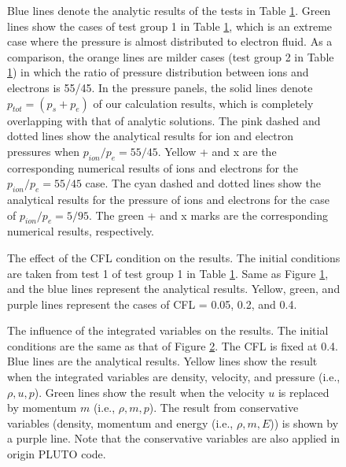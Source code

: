 \documentclass[journal, onecolumn]{aastex631}
\begin{document}
\begin{CJK*}{UTF8}{gbsn}
\begin{appendix}
\begin{table}[!t]
\begin{threeparttable}[t]
\begin{tabular}{ccccccccccc}
\bottomrule

\end{tabular}\label{tab:test_para}
\end{threeparttable}
\end{table}


\begin{figure}[ht!]
\caption{Blue lines denote the analytic results of the tests in Table \ref{tab:test_para}. Green lines show the cases of test group 1 in Table \ref{tab:test_para}, which is an extreme case where the pressure is almost distributed to electron fluid. As a comparison, the orange lines are milder cases (test group 2 in Table \ref{tab:test_para}) in which the ratio of pressure distribution between ions and electrons is 55/45. In the pressure panels, the solid lines denote $p_{tot} = (p_s+p_e)$ of our calculation results, which is completely overlapping with that of analytic solutions. The pink dashed and dotted lines show the analytical results for ion and electron pressures when $p_{ion}/p_{e}=55/45$. Yellow + and x are the corresponding numerical results of ions and electrons for the $p_{ion}/p_{e}=55/45$ case.  The cyan dashed and dotted lines show the analytical results for the pressure of ions and electrons for the case of $p_{ion}/p_{e}=5/95$. The green + and x marks are the corresponding numerical results, respectively.}
\label{fig:org_test}
\end{figure}

\begin{figure}[ht!]
\caption{The effect of the CFL condition on the results. The initial conditions are taken from test 1 of test group 1 in Table \ref{tab:test_para}. Same as Figure \ref{fig:org_test}, and the blue lines represent the analytical results. Yellow, green, and purple lines represent the cases of CFL = 0.05, 0.2, and 0.4.}
\label{fig:cfl_test}
\end{figure}

\begin{figure}[ht!]
\caption{The influence of the integrated variables on the results. The initial conditions are the same as that of Figure \ref{fig:cfl_test}. The CFL is fixed at 0.4. Blue lines are the analytical results. Yellow lines show the result when the integrated variables are density, velocity, and pressure (i.e., $\rho, u, p$). Green lines show the result when the velocity $u$ is replaced by momentum $m$ (i.e., $\rho, m, p$). The result from conservative variables (density, momentum and energy (i.e., $\rho, m, E$)) is shown by a purple line. Note that the conservative variables are also applied in origin PLUTO code.}
\label{fig:con_test}
\end{figure}


\end{appendix}
\end{CJK*}
\end{document}
